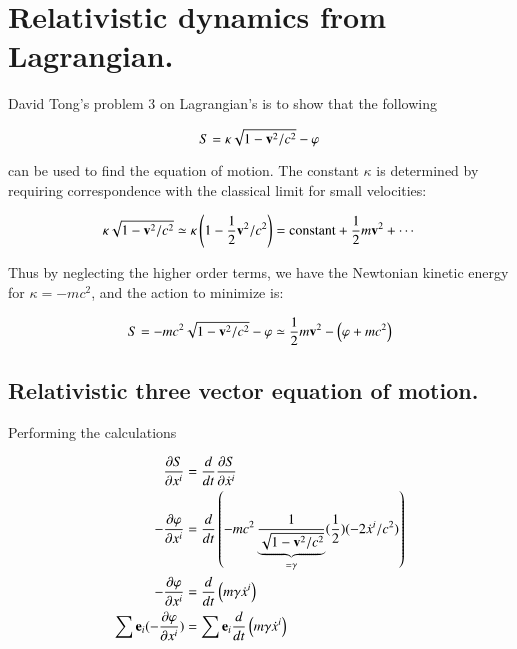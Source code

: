 \documentclass{article}      %
\title{} %
\author{Peeter Joot \quad peeter.joot@gmail.com}         %
\date{ June 10, 2008.  Last Revision: $Date: 2009/02/22 15:35:07 $ }
\newcommand{\PD}[2]{ \frac{\partial{#1}}{\partial {#2}} }
\begin{document}

\maketitle{}

\section{ Relativistic dynamics from Lagrangian. }

David Tong's problem 3 on Lagrangian's is to show that the following

\begin{equation}
S = \kappa \sqrt{1 - \mathbf{v}^2/c^2} - \varphi
\end{equation}

can be used to find the equation of motion.  The constant $\kappa$ is determined
by requiring correspondence with the classical limit for small velocities:

\begin{equation*}
\kappa \sqrt{1 - \mathbf{v}^2/c^2} \simeq \kappa \left( 1 - \frac{1}{2} \mathbf{v}^2/c^2 \right) = \text{constant} + \frac{1}{2} m \mathbf{v}^2 + \cdots
\end{equation*}

Thus by neglecting the higher order terms, we have the Newtonian kinetic energy for $\kappa = -mc^2$, and the action to minimize is:

\begin{equation}
S = -m c^2\sqrt{1 - \mathbf{v}^2/c^2} - \varphi \simeq \frac{1}{2}m \mathbf{v}^2 - \left(\varphi + m c^2\right)
\end{equation}

\subsection{ Relativistic three vector equation of motion. }

Performing the calculations

\begin{align*}
\PD{S}{x^i} &= \frac{d}{dt} \PD{S}{\dot{x}^i} \\
-\PD{\varphi}{x^i} &= \frac{d}{dt} \left(-mc^2 \underbrace{\inv{\sqrt{1-\Bv^2/c^2}}}_{=\gamma} (\inv{2})(-2\dot{x}^i/c^2)\right) \\
-\PD{\varphi}{x^i} &= \frac{d}{dt} \left( m \gamma \dot{x}^i\right) \\
\sum \Be_i (-\PD{\varphi}{x^i}) &= \sum \Be_i \frac{d}{dt} \left( m \gamma \dot{x}^i\right) \\
\end{align*}
\end{document}
